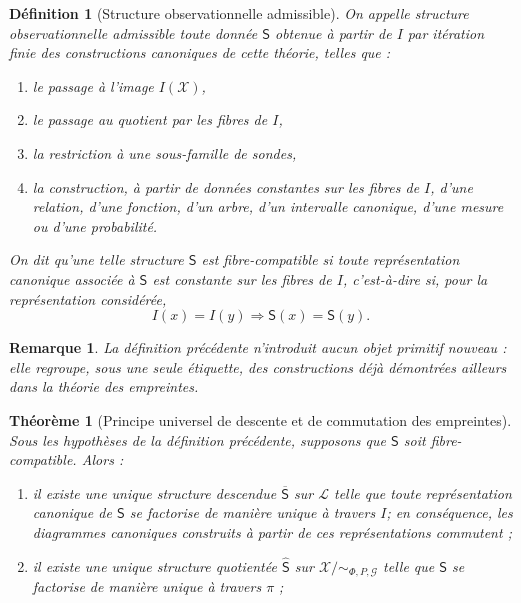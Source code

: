 \documentclass[11pt,a4paper]{article}
\newtheorem{definition}{Définition}
\newtheorem{theorem}{Théorème}
\newtheorem{remark}{Remarque}
\begin{document}
\begin{appendices}
\begin{definition}[Structure observationnelle admissible]
On appelle \emph{structure observationnelle admissible} toute donnée \(\mathsf S\) obtenue à partir de \(I\) par itération finie des constructions canoniques de cette théorie, telles que :
\begin{enumerate}[label=\textbf{(\arabic*)}]
\item le passage à l'image \(I(\mathcal X)\),
\item le passage au quotient par les fibres de \(I\),
\item la restriction à une sous-famille de sondes,
\item la construction, à partir de données constantes sur les fibres de \(I\), d'une relation, d'une fonction, d'un arbre, d'un intervalle canonique, d'une mesure ou d'une probabilité.
\end{enumerate}

On dit qu'une telle structure \(\mathsf S\) est \emph{fibre-compatible} si toute représentation canonique associée à \(\mathsf S\) est constante sur les fibres de \(I\), c'est-à-dire si, pour la représentation considérée,
\[
I(x)=I(y)\Longrightarrow \mathsf S(x)=\mathsf S(y).
\]
\end{definition}

\begin{remark}
La définition précédente n'introduit aucun objet primitif nouveau : elle regroupe, sous une seule étiquette, des constructions déjà démontrées ailleurs dans la théorie des empreintes.
\end{remark}

\begin{theorem}[Principe universel de descente et de commutation des empreintes]
\label{thm:principe-universel-commutation}
Sous les hypothèses de la définition précédente, supposons que \(\mathsf S\) soit fibre-compatible. Alors :

\begin{enumerate}[label=\textbf{(\alph*)}]
\item il existe une unique structure descendue \(\overline{\mathsf S}\) sur \(\mathcal L\) telle que toute représentation canonique de \(\mathsf S\) se factorise de manière unique à travers \(I\); en conséquence, les diagrammes canoniques construits à partir de ces représentations commutent ;

\item il existe une unique structure quotientée \(\widehat{\mathsf S}\) sur \(\mathcal X/{\sim_{\Phi,P,\mathcal G}}\) telle que \(\mathsf S\) se factorise de manière unique à travers \(\pi\) ;


\end{enumerate}
\end{theorem}
\end{appendices}
\end{document}
